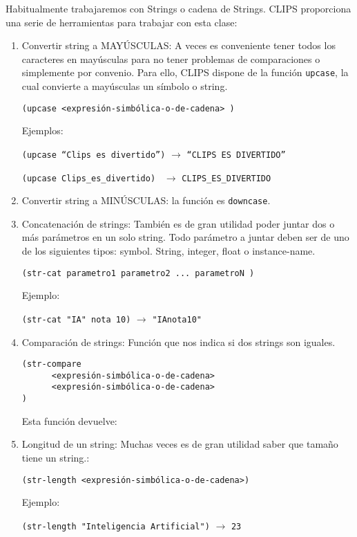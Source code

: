 \documentclass[11pt,svgnames]{scrbook}
\begin{document}
	Habitualmente trabajaremos con Strings o cadena de Strings. CLIPS
proporciona una serie de herramientas para trabajar con esta clase:
\begin{enumerate}
 \item Convertir string a MAYÚSCULAS: A veces es conveniente tener todos los
caracteres en mayúsculas para no tener problemas de comparaciones o simplemente
por convenio. Para ello, CLIPS dispone de la función \texttt{upcase}, la cual
convierte a mayúsculas un símbolo o string.

\texttt{(upcase  <expresión-simbólica-o-de-cadena>  )}

Ejemplos:

\texttt{(upcase ``Clips es divertido'')}  $\rightarrow$ \texttt{``CLIPS ES
DIVERTIDO''}

\texttt{(upcase  Clips\_es\_divertido) } $\rightarrow$ 
\texttt{CLIPS\_ES\_DIVERTIDO}

\item Convertir string a MINÚSCULAS: la función es \texttt{downcase}.

\item Concatenación de strings: También es de gran utilidad poder juntar dos o
más parámetros  en un solo string.  Todo parámetro a juntar deben ser de uno de
los siguientes tipos: symbol. String, integer, float o instance-name.

\texttt{(str-cat      parametro1     parametro2     ...     parametroN  )}

Ejemplo:

\texttt{(str-cat "IA"{} nota 10)}  $\rightarrow$  \texttt{"IAnota10"}

\item Comparación de strings:  Función que nos indica si dos strings son
iguales.

\begin{verbatim}
(str-compare
      <expresión-simbólica-o-de-cadena> 
      <expresión-simbólica-o-de-cadena>
)\end{verbatim} 

Esta función devuelve:

\item Longitud de un string: Muchas veces es de gran utilidad saber que tamaño
tiene un string.:

\texttt{(str-length    <expresión-simbólica-o-de-cadena>)}

Ejemplo:

\texttt{(str-length "Inteligencia Artificial")}  $\rightarrow$ \texttt{23}

\end{enumerate}
\end{document}
